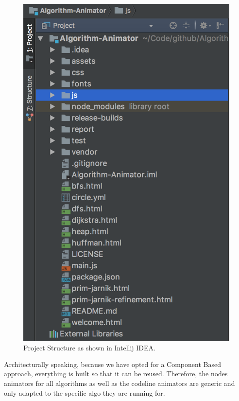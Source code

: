 \documentclass{l4proj}
\begin{document}
\begin{figure}[!ht]
    \centering
    \includegraphics[scale=0.4]{project-structure}
    \caption{Project Structure as shown in Intellij IDEA.}
    \label{fig:project-structure}
\end{figure}

\pagebreak

Architecturally speaking, because we have opted for a Component Based approach, everything is built so that it can be
reused. Therefore, the nodes animators for all algorithms as well as the codeline animators are generic and only
adapted to the specific algo they are running for. 
\end{document}
